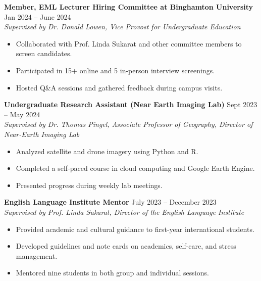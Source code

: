 \documentclass[11pt]{article}
\begin{document}
\noindent
\textbf{Member, EML Lecturer Hiring Committee at Binghamton University} \hfill Jan 2024 -- June 2024 \\
\textit{Supervised by Dr. Donald Lowen, Vice Provost for Undergraduate Education }\\
\begin{itemize}[leftmargin=*]
    \item Collaborated with Prof. Linda Sukarat and other committee members to screen candidates.
    \item Participated in 15+ online and 5 in-person interview screenings.
    \item Hosted Q\&A sessions and gathered feedback during campus visits.
\end{itemize}

\noindent
\textbf{Undergraduate Research Assistant (Near Earth Imaging Lab)} \hfill Sept 2023 -- May 2024 \\
\textit{Supervised by Dr. Thomas Pingel, Associate Professor of Geography, Director of Near-Earth Imaging Lab}
\begin{itemize}[leftmargin=*]
    \item Analyzed satellite and drone imagery using Python and R.
    \item Completed a self-paced course in cloud computing and Google Earth Engine.
    \item Presented progress during weekly lab meetings.
\end{itemize}

\noindent
\textbf{English Language Institute Mentor} \hfill July 2023 -- December 2023 \\
\textit{Supervised by Prof. Linda Sukarat, Director of the English Language Institute}
\begin{itemize}[leftmargin=*]
    \item Provided academic and cultural guidance to first-year international students.
    \item Developed guidelines and note cards on academics, self-care, and stress management.
    \item Mentored nine students in both group and individual sessions.
\end{itemize}
\end{document}

